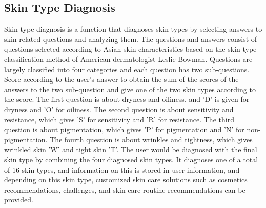 \documentclass[conference]{IEEEtran}
\begin{document}
\subsection{Skin Type Diagnosis}
Skin type diagnosis is a function that diagnoses skin types by selecting answers to skin-related questions and analyzing them. The questions and answers consist of questions selected according to Asian skin characteristics based on the skin type classification method of American dermatologist Leslie Bowman. Questions are largely classified into four categories and each question has two sub-questions. Score according to the user's answer to obtain the sum of the scores of the answers to the two sub-question and give one of the two skin types according to the score. The first question is about dryness and oiliness, and 'D' is given for dryness and 'O' for oiliness. The second question is about sensitivity and resistance, which gives 'S' for sensitivity and 'R' for resistance. The third question is about pigmentation, which gives 'P' for pigmentation and 'N' for non-pigmentation. The fourth question is about wrinkles and tightness, which gives wrinkled skin 'W' and tight skin 'T'. The user would be diagnosed with the final skin type by combining the four diagnosed skin types. It diagnoses one of a total of 16 skin types, and information on this is stored in user information, and depending on this skin type, customized skin care solutions such as cosmetics recommendations, challenges, and skin care routine recommendations can be provided. \\
\end{document}
